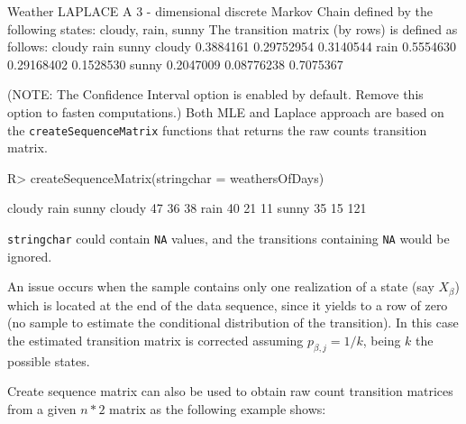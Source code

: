 \documentclass[
  nojss]{jss}
\begin{document}
\begin{CodeChunk}


\begin{CodeOutput}
Weather LAPLACE 
 A  3 - dimensional discrete Markov Chain defined by the following states: 
 cloudy, rain, sunny 
 The transition matrix  (by rows)  is defined as follows: 
          cloudy       rain     sunny
cloudy 0.3884161 0.29752954 0.3140544
rain   0.5554630 0.29168402 0.1528530
sunny  0.2047009 0.08776238 0.7075367
\end{CodeOutput}
\end{CodeChunk}

(NOTE: The Confidence Interval option is enabled by default. Remove this option to fasten computations.) Both MLE and Laplace approach are based on the \texttt{createSequenceMatrix} functions that returns the raw counts transition matrix.

\begin{CodeChunk}

\begin{CodeInput}
R> createSequenceMatrix(stringchar = weathersOfDays)
\end{CodeInput}

\begin{CodeOutput}
       cloudy rain sunny
cloudy     47   36    38
rain       40   21    11
sunny      35   15   121
\end{CodeOutput}
\end{CodeChunk}

\texttt{stringchar} could contain \texttt{NA} values, and the transitions containing \texttt{NA} would be ignored.

An issue occurs when the sample contains only one realization of a state (say \(X_{\beta}\)) which is located at the end of the data sequence, since it yields to a row of zero (no sample to estimate the conditional distribution of the transition). In this case the estimated transition matrix is corrected assuming \(p_{\beta,j}=1/k\), being \(k\) the possible states.

Create sequence matrix can also be used to obtain raw count transition matrices from a given \(n*2\) matrix as the following example shows:
\end{document}
